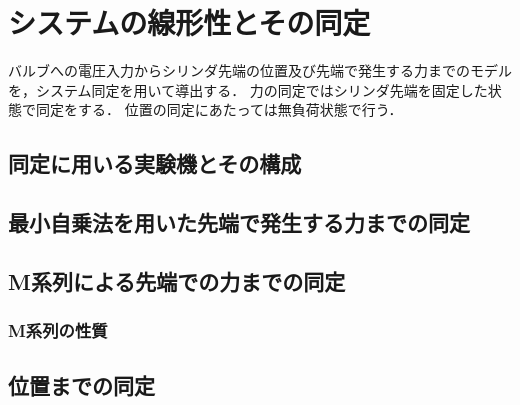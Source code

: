 \chapter{システムの線形性とその同定}
バルブへの電圧入力からシリンダ先端の位置及び先端で発生する力までのモデルを，システム同定を用いて導出する．
力の同定ではシリンダ先端を固定した状態で同定をする．
位置の同定にあたっては無負荷状態で行う．
\section{同定に用いる実験機とその構成}
\section{最小自乗法を用いた先端で発生する力までの同定}
\section{M系列による先端での力までの同定}
\subsection{M系列の性質}
\section{位置までの同定}
